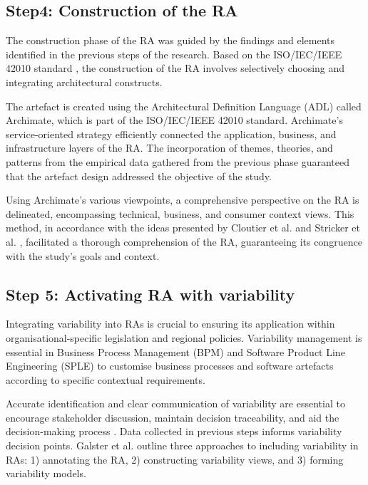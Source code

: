 \documentclass[preprint,12pt]{elsarticle}
\begin{document}
\subsection{Step4: Construction of the RA}

The construction phase of the RA was guided by the findings and elements identified in the previous steps of the research. Based on the ISO/IEC/IEEE 42010 standard \cite{ISO42010}, the construction of the RA involves selectively choosing and integrating architectural constructs.

The artefact is created using the Architectural Definition Language (ADL) called Archimate, which is part of the ISO/IEC/IEEE 42010 standard. Archimate's service-oriented strategy efficiently connected the application, business, and infrastructure layers of the RA. The incorporation of themes, theories, and patterns from the empirical data gathered from the previous phase guaranteed that the artefact design addressed the objective of the study.

Using Archimate's various viewpoints, a comprehensive perspective on the RA is delineated, encompassing technical, business, and consumer context views. This method, in accordance with the ideas presented by Cloutier et al. \cite{Cloutier2010} and Stricker et al. \cite{stricker2010creating}, facilitated a thorough comprehension of the RA, guaranteeing its congruence with the study's goals and context.

\subsection{Step 5: Activating RA with variability}

Integrating variability into RAs is crucial to ensuring its application within organisational-specific legislation and regional policies. Variability management is essential in Business Process Management (BPM) and Software Product Line Engineering (SPLE) to customise business processes and software artefacts according to specific contextual requirements.

Accurate identification and clear communication of variability are essential to encourage stakeholder discussion, maintain decision traceability, and aid the decision-making process \cite{czarnecki2012cool}. Data collected in previous steps informs variability decision points. Galster et al. \cite{GALSTER2011Empirically} outline three approaches to including variability in RAs: 1) annotating the RA, 2) constructing variability views, and 3) forming variability models.
\end{document}
